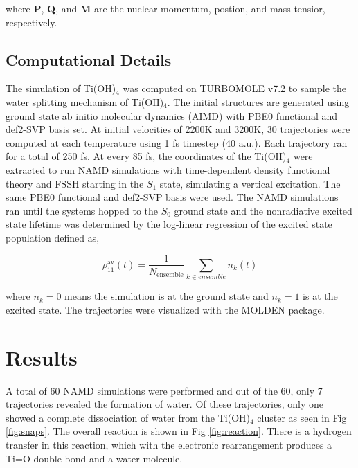 \documentclass[11pt]{article}
\begin{document}
where \textbf{P}, \textbf{Q}, and \textbf{M} are the nuclear momentum,
postion, and mass tensior, respectively.

\subsection{Computational Details}

The simulation of Ti(OH)$_4$ was computed on TURBOMOLE v7.2\cite{TURBOMOLE}
to sample the water splitting mechanism of Ti(OH)$_4$. The initial structures
are generated using ground state ab initio molecular dynamics (AIMD)
with PBE0\cite{doi:10.1063/1.478522} functional and def2-SVP basis set\cite{doi:10.1063/1.463096}.
At initial velocities of 2200K and 3200K, 30 trajectories were computed
at each temperature using 1 fs timestep (40 a.u.). Each trajectory ran
for a total of 250 fs. At every 85 fs, the coordinates of
the Ti(OH)$_4$ were extracted to run NAMD simulations with time-dependent
density functional theory and FSSH starting in the $S_1$ state,
simulating a vertical excitation. The same
PBE0\cite{doi:10.1063/1.478522} functional and def2-SVP basis\cite{doi:10.1063/1.463096}
were used. The NAMD simulations ran until the systems hopped to the $S_0$
ground state and the nonradiative excited state lifetime was determined by
the log-linear regression of the excited state population defined as,

\begin{equation}
  \rho^{\text{av}}_{11}(t) = \frac{1}{N_{\text{ensemble}}}\sum_{k\in ensemble}n_k(t)
\end{equation}

where $n_k=0$ means the simulation is at the ground state and $n_k=1$ is at
the excited state. The trajectories were visualized with the
MOLDEN package.

\section{Results}

A total of 60 NAMD simulations were performed and out of the 60,
only 7
trajectories revealed the formation of water. Of these trajectories,
only one showed a complete dissociation of water from the Ti(OH)$_4$
cluster as seen in Fig \ref{fig:snaps}. The overall reaction is
shown in Fig \ref{fig:reaction}. There is a hydrogen transfer in
this reaction, which with the electronic rearrangement produces
a Ti=O double bond and a water molecule.
\end{document}
